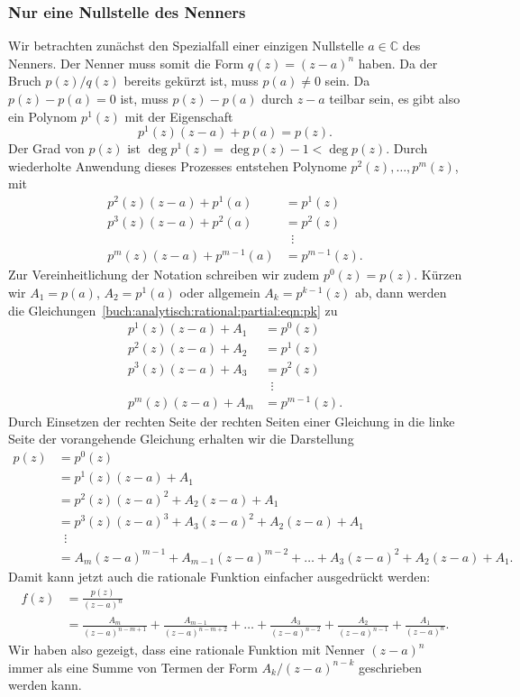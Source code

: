 \subsubsection{Nur eine Nullstelle des Nenners}
Wir betrachten zunächst den Spezialfall einer einzigen Nullstelle
$ a\in\mathbb{C}$ des Nenners.
%
Der Nenner muss somit die Form $q(z) = (z- a)^n$ haben.
Da der Bruch $p(z)/q(z)$ bereits gekürzt ist, muss $p( a)\ne 0$
sein.
Da $p(z)-p( a)=0$ ist, muss $p(z)-p( a)$ durch $z- a$
teilbar sein, es gibt also ein Polynom $p^1(z)$ mit der Eigenschaft
\[
p^1(z)(z- a) + p( a) = p(z).
\]
Der Grad von $p(z)$ ist $\deg p^1(z) = \deg p(z)-1 < \deg p(z)$.
Durch wiederholte Anwendung dieses Prozesses entstehen Polynome
$p^2(z),\dots,p^m(z)$, mit 
\begin{equation}
\begin{aligned}
p^2(z)(z- a) + p^1( a)     &= p^1(z)           \\
p^3(z)(z- a) + p^2( a)     &= p^2(z)           \\[-2pt]
                                   &\phantom{a} \vdots \\
p^m(z)(z- a) + p^{m-1}( a) &= p^{m-1}(z).
\end{aligned}
\label{buch:analytisch:rational:partial:eqn:pk}
\end{equation}
Zur Vereinheitlichung der Notation schreiben wir zudem $p^0(z)=p(z)$.
Kürzen wir $A_1=p( a)$, $A_2=p^1( a)$ oder allgemein
$A_k = p^{k-1}(z)$ ab, dann werden die
Gleichungen~\eqref{buch:analytisch:rational:partial:eqn:pk}
zu
\[
\begin{aligned}
p^1(z)(z- a) + A_1 &= p^0(z)           \\
p^2(z)(z- a) + A_2 &= p^1(z)           \\
p^3(z)(z- a) + A_3 &= p^2(z)           \\[-2pt]
                       &\phantom{a} \vdots \\
p^m(z)(z- a) + A_m &= p^{m-1}(z).
\end{aligned}
\]
Durch Einsetzen der rechten Seite der rechten Seiten einer Gleichung
in die linke Seite der vorangehende Gleichung erhalten wir die
Darstellung
\begin{align*}
p(z)
&=
p^0(z)
\\
&=
p^1(z)(z- a) + A_1
\\
&=
p^2(z)(z- a)^2 + A_2(z- a) + A_1
\\
&=
p^3(z)(z- a)^3 + A_3 (z- a)^2 + A_2 (z- a) + A_1
\\[-2pt]
&\phantom{a}\vdots
\\
&=
A_m(z-a)^{m-1} + A_{m-1}(z- a)^{m-2} + \ldots + A_3 (z- a)^2 + A_2(z- a) + A_1.
\end{align*}
Damit kann jetzt auch die rationale Funktion einfacher ausgedrückt
werden:
\begin{align*}
f(z)
&=
\frac{p(z)}{(z- a)^n}
\\
&=
\frac{A_m}{(z- a)^{n-m+1}}
+
\frac{A_{m-1}}{(z- a)^{n-m+2}}
+
\ldots
+
\frac{A_3}{(z- a)^{n-2}}
+
\frac{A_2}{(z- a)^{n-1}}
+
\frac{A_1}{(z- a)^n}.
\end{align*}
Wir haben also gezeigt, dass eine rationale Funktion mit Nenner
$(z- a)^n$ immer als eine Summe von Termen der Form $A_k/(z- a)^{n-k}$
geschrieben werden kann.

